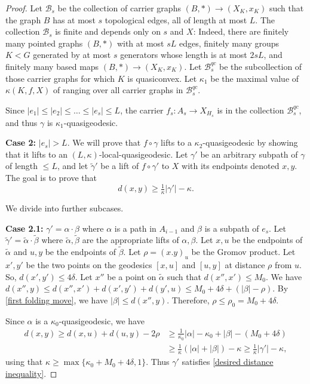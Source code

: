 \documentclass[article, 12pt]{amsart}
\numberwithin{equation}{section}
\theoremstyle{definition}
\newcommand{\calB}{\mathcal{B}}
\newcommand{\tild}[1]{\widetilde{#1}}
\begin{document}
\begin{proof}
    Let $\calB_s$ be the collection of carrier graphs $(B,\ast)\to (X_K,x_K)$ such that the graph $B$ has at most $s$ topological edges, all of length at most $L$.
    The collection $\calB_s$ is finite and depends only on $s$ and $X$:
    Indeed, there are finitely many pointed graphs $(B,\ast)$ with at most $sL$ edges, finitely many groups $K<G$ generated by at most $s$ generators whose length is at most $2sL$, and finitely many based maps $(B,\ast)\to (X_K,x_K)$. 
    Let $\calB^{qc}_s$ be the subcollection of those carrier graphs for which $K$ is quasiconvex. 
    Let $\kappa_1$ be the maximal value of $\kappa(K,f,X)$ of  ranging over all carrier graphs in $\calB^{qc}_s$. 
    
    Since $|e_1|\le |e_2|\le \dots \le|e_s|\le L$, the carrier $f_s:A_s\to X_{H_s}$ is in the collection $\calB^{qc}_s$, and thus $\gamma$ is $\kappa_1$-quasigeodesic.

    
    \textbf{Case 2:} $|e_s|>L$.
    We will prove that $f\circ \gamma$ lifts to a $\kappa_2$-quasigeodesic by showing that it lifts to an $(L,\kappa)$-local-quasigeodesic.
    Let $\gamma'$ be an arbitrary subpath of $\gamma$ of length $\le L$, and let $\tild\gamma'$ be a lift of $f\circ\gamma'$ to $X$ with its endpoints denoted $x,y$. 
    The goal is to prove that 
    \begin{equation}\label{desired distance inequality}
        d(x,y)\ge \tfrac1 {\kappa}|\gamma'| - \kappa.
    \end{equation}
    
    We divide into further subcases.
    
    \textbf{Case 2.1:} $\gamma'=\alpha\cdot \beta$  where $\alpha$ is a path in $A_{i-1}$ and $\beta$ is a subpath of $e_s$. 
    Let $\tild \gamma' = \tild\alpha\cdot  \tild \beta$ where $\tild\alpha, \tild \beta$ are the appropriate lifts of $\alpha, \beta$.
    Let $x,u$ be the endpoints of $\tild \alpha$ and $u,y$ be the endpoints of $\tild \beta$.
    Let $\rho = (x.y)_{u}$ be the Gromov product.
    Let $x',y'$ be the two points on the geodesics $[x,u]$ and $[u,y]$ at distance $\rho$ from $u$. 
    So, $d(x',y')\le 4\delta$.
    Let $x''$ be a point on $\tild\alpha$ such that $d(x'',x')\le M_0$.
    We have $d(x'',y)\le d(x'',x')+d(x',y')+d(y',u) \le M_0+4\delta +(|\beta |-\rho)$.
    By \ref{first folding move}, we have 
    $|\beta|\le d(x'',y)$.
    Therefore, $\rho \le \rho_0=M_0+4\delta$.

    Since $\alpha$ is a $\kappa_0$-quasigeodesic, we have
    \begin{align*}
        d(x,y)\ge d(x,u)+d(u,y) - 2\rho &\ge \tfrac 1{\kappa_0}|\alpha|-\kappa_0+|\beta| -(M_0+4\delta) \\
        &\ge \tfrac 1{\kappa}(|\alpha|+|\beta|) - \kappa \ge \tfrac 1{\kappa} |\gamma'|-\kappa,
    \end{align*} 
    using that $\kappa \ge \max\{\kappa_0+M_0+4\delta,1\}$.
    Thus $\gamma'$ satisfies \ref{desired distance inequality}.


\end{proof}
\end{document}
